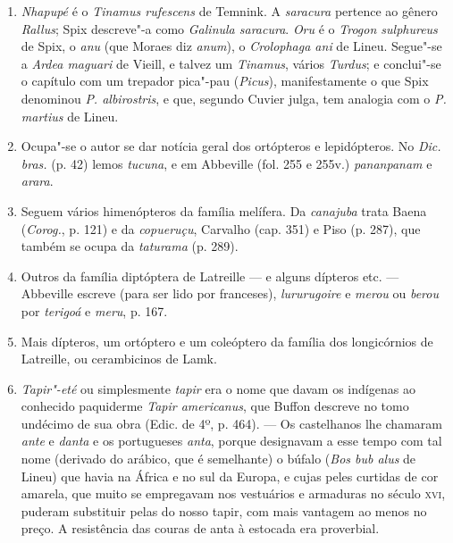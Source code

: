 \begin{enumerate}
\item \textit{Nhapupé} é o \textit{Tinamus rufescens} de Temnink. A \textit{saracura} pertence ao gênero  
\textit{Rallus}; Spix descreve"-a como \textit{Galinula saracura}. \textit{Oru} é o \textit{Trogon sulphureus} de Spix, 
o \textit{anu} (que Moraes diz \textit{anum}), o \textit{Crolophaga ani} de Lineu. Segue"-se a \textit{Ardea maguari} 
de Vieill, e talvez um \textit{Tinamus}, vários \textit{Turdus}; e conclui"-se o capítulo com um 
trepador pica"-pau (\textit{Picus}), manifestamente o que Spix denominou \textit{P. albirostris}, e que, 
segundo Cuvier julga, tem analogia com o \textit{P. martius} de Lineu.

\item Ocupa"-se o autor se dar notícia geral dos ortópteros e lepidópteros. No \textit{Dic. bras.} 
(p. 42) lemos \textit{tucuna}, e em Abbeville (fol. 255 e 255v.) \textit{pananpanam} e \textit{arara}.

\item  Seguem vários himenópteros da família melífera. Da \textit{canajuba}
trata Baena (\textit{Corog.}, p. 121) e da \textit{copueruçu}, Carvalho (cap. 351) e Piso (p.
287), que também se ocupa da \textit{taturama} (p. 289).

\item Outros da família diptóptera de Latreille --- e alguns dípteros etc. --- Abbeville 
escreve (para ser lido por franceses), \textit{lururugoire} e \textit{merou} ou \textit{berou} por \textit{terigoá} e \textit{meru}, p.
167.

\item Mais dípteros, um ortóptero e um coleóptero da família dos longicórnios de 
Latreille, ou cerambicinos de Lamk.

\item \textit{Tapir"-eté} ou simplesmente \textit{tapir} era o nome que davam os indígenas ao conhecido 
paquiderme \textit{Tapir americanus}, que Buffon descreve no tomo undécimo de sua obra 
(Edic. de 4º, p. 464). --- Os castelhanos lhe chamaram \textit{ante} e \textit{danta} e os portugueses 
\textit{anta}, porque designavam a esse tempo com tal nome (derivado do arábico, que é 
semelhante) o búfalo (\textit{Bos bub alus} de Lineu) que havia na África e no sul da Europa, e 
cujas peles curtidas de cor amarela, que muito se empregavam nos vestuários e 
armaduras no século \textsc{xvi}, puderam substituir pelas do nosso tapir, com mais vantagem ao 
menos no preço. A resistência das couras de anta à estocada era proverbial. 


\end{enumerate}

